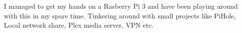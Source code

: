 \documentclass[a4paper]{deedy-resume} %
\begin{document}
\begin{minipage}[t]{0.66\textwidth}
\sectionspace %
\descript{}

\begin{tightitemize}
\item I managed to get my hands on a Rasberry Pi 3 and have been playing around with this in my spare time. Tinkering around with small projects like PiHole, Local network share, Plex media server, VPN etc.  
\end{tightitemize}
\sectionspace %


\end{minipage} %
\end{document}
